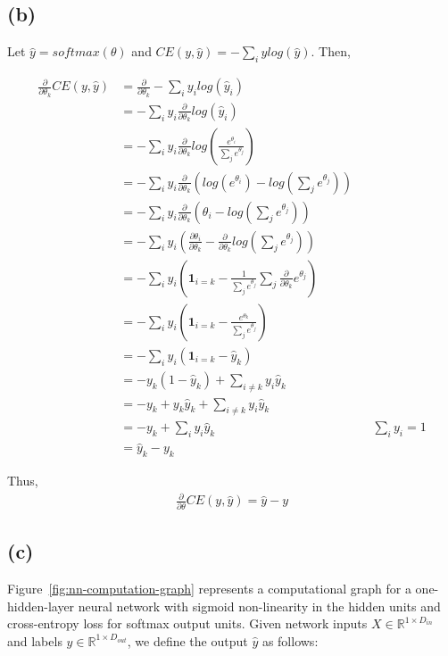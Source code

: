 \documentclass[11pt]{article}
\newcommand{\R}{\mathbb{R}}
\begin{document}
\subsection*{(b)}
Let $\hat{y} = softmax(\theta)$ and $CE(y, \hat{y}) = -\sum_{i}{y log(\hat{y})}$. Then,

\begin{align*}
    \frac{ \partial }{ \partial \theta_{k} } CE(y, \hat{y})
      &= \frac{ \partial }{ \partial \theta_{k} } -\sum_{i}{y_i log(\hat{y}_i)} \\
      &= -\sum_{i}{y_i \frac{ \partial }{ \partial \theta_{k} } log(\hat{y}_i)} \\
      &= -\sum_{i}{y_i \frac{ \partial }{ \partial \theta_{k} } log(\frac{e^{\theta_i}}{\sum_{j}{e^{\theta_j}}})} \\
      &= -\sum_{i}{y_i \frac{ \partial }{ \partial \theta_{k} } (log(e^{\theta_i}) - log(\sum_{j}{e^{\theta_j}}))} \\
      &= -\sum_{i}{y_i \frac{ \partial }{ \partial \theta_{k} } (\theta_i - log(\sum_{j}{e^{\theta_j}}))} \\
      &= -\sum_{i}{y_i (\frac{ \partial \theta_{i} }{ \partial \theta_{k} } - \frac{ \partial }{ \partial \theta_{k} }log(\sum_{j}{e^{\theta_j}}) )} \\
      &= -\sum_{i}{y_i (\mathbf{1}_{i=k} - \frac{1}{\sum_{j}{e^{\theta_j}}} \sum_{j}{\frac{ \partial }{ \partial \theta_{k} } e^{\theta_j}} )} \\
      &= -\sum_{i}{y_i (\mathbf{1}_{i=k} - \frac{ e^{\theta_k} }{\sum_{j}{e^{\theta_j}}} )} \\
      &= -\sum_{i}{y_i (\mathbf{1}_{i=k} - \hat{y}_k )} \\
      &= -y_k(1 - \hat{y}_k) + \sum_{i \neq k}{y_{i}\hat{y}_{k}} \\
      &= -y_k + y_k\hat{y}_k + \sum_{i \neq k}{y_{i}\hat{y}_{k}} \\
      &= -y_k + \sum_{i}{y_{i}\hat{y}_{k}} && \sum_{i}y_{i} = 1\\
      &= \hat{y}_{k} - y_k
\end{align*}

Thus,
\begin{align*}
      \frac{ \partial }{ \partial \theta } CE(y, \hat{y}) = \hat{y} - y
\end{align*}


\subsection*{(c)}
Figure~\ref{fig:nn-computation-graph} represents a computational graph for a one-hidden-layer neural network with sigmoid non-linearity in the hidden units and cross-entropy loss for softmax output units. Given network inputs $X \in \R^{1 \times D_{in}}$ and labels $y \in \R^{1 \times D_{out}}$, we define the output $\hat{y}$ as follows:
\end{document}
